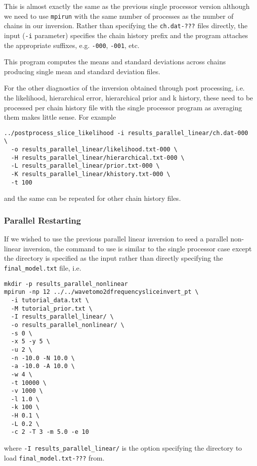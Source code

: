 \documentclass[a4paper,12pt]{article}
\begin{document}
This is almost exactly the same as the previous single processor version
although we need to use {\tt mpirun} with the same number of processes
as the number of chains in our inversion. Rather than specifying the
{\tt ch.dat-???} files directly, the input ({\tt -i} parameter)
specifies the chain history prefix and the program attaches the
appropriate suffixes, e.g.  {\tt -000}, {\tt -001}, etc.

This program computes the means and standard deviations across chains
producing single mean and standard deviation files.

For the other diagnostics of the inversion obtained through post
processing, i.e.  the likelihood, hierarchical error, hierarchical
prior and k history, these need to be processed per chain history file
with the single processor program as averaging them makes little sense. For
example

\begin{verbatim}
../postprocess_slice_likelihood -i results_parallel_linear/ch.dat-000 \
  -o results_parallel_linear/likelihood.txt-000 \
  -H results_parallel_linear/hierarchical.txt-000 \
  -L results_parallel_linear/prior.txt-000 \
  -K results_parallel_linear/khistory.txt-000 \
  -t 100
\end{verbatim}

and the same can be repeated for other chain history files.

\subsubsection{Parallel Restarting}

If we wished to use the previous parallel linear inversion to seed a
parallel non-linear inversion, the command to use is similar to the
single processor case except the directory is specified as the
input rather than directly specifying the {\tt final\_model.txt}
file, i.e.

\begin{verbatim}
mkdir -p results_parallel_nonlinear
mpirun -np 12 ../../wavetomo2dfrequencysliceinvert_pt \
  -i tutorial_data.txt \
  -M tutorial_prior.txt \
  -I results_parallel_linear/ \
  -o results_parallel_nonlinear/ \
  -s 0 \
  -x 5 -y 5 \
  -u 2 \
  -n -10.0 -N 10.0 \
  -a -10.0 -A 10.0 \
  -w 4 \
  -t 10000 \
  -v 1000 \
  -l 1.0 \
  -k 100 \
  -H 0.1 \
  -L 0.2 \
  -c 2 -T 3 -m 5.0 -e 10
\end{verbatim}

where {\tt -I results\_parallel\_linear/} is the option specifying the
directory to load {\tt final\_model.txt-???} from.
\end{document}
